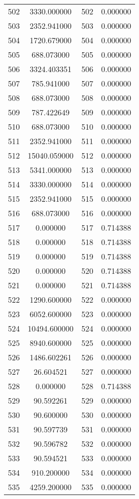 \documentclass[12pt]{article}
\begin{document}
\begin{longtable}{@{}cccc@{}}
502 & 3330.000000 & 502 & 0.000000 \\
503 & 2352.941000 & 503 & 0.000000 \\
504 & 1720.679000 & 504 & 0.000000 \\
505 & 688.073000 & 505 & 0.000000 \\
506 & 3324.403351 & 506 & 0.000000 \\
507 & 785.941000 & 507 & 0.000000 \\
508 & 688.073000 & 508 & 0.000000 \\
509 & 787.422649 & 509 & 0.000000 \\
510 & 688.073000 & 510 & 0.000000 \\
511 & 2352.941000 & 511 & 0.000000 \\
512 & 15040.059000 & 512 & 0.000000 \\
513 & 5341.000000 & 513 & 0.000000 \\
514 & 3330.000000 & 514 & 0.000000 \\
515 & 2352.941000 & 515 & 0.000000 \\
516 & 688.073000 & 516 & 0.000000 \\
517 & 0.000000 & 517 & 0.714388 \\
518 & 0.000000 & 518 & 0.714388 \\
519 & 0.000000 & 519 & 0.714388 \\
520 & 0.000000 & 520 & 0.714388 \\
521 & 0.000000 & 521 & 0.714388 \\
522 & 1290.600000 & 522 & 0.000000 \\
523 & 6052.600000 & 523 & 0.000000 \\
524 & 10494.600000 & 524 & 0.000000 \\
525 & 8940.600000 & 525 & 0.000000 \\
526 & 1486.602261 & 526 & 0.000000 \\
527 & 26.604521 & 527 & 0.000000 \\
528 & 0.000000 & 528 & 0.714388 \\
529 & 90.592261 & 529 & 0.000000 \\
530 & 90.600000 & 530 & 0.000000 \\
531 & 90.597739 & 531 & 0.000000 \\
532 & 90.596782 & 532 & 0.000000 \\
533 & 90.594521 & 533 & 0.000000 \\
534 & 910.200000 & 534 & 0.000000 \\
535 & 4259.200000 & 535 & 0.000000 \\

\end{longtable}
\end{document}
